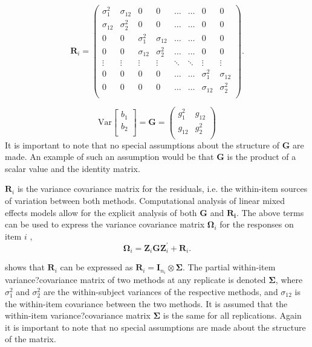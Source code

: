 \documentclass[12pt, a4paper]{report}
\theoremstyle{plain}
\theoremstyle{definition}
\theoremstyle{remark}
\begin{document}
\[ \boldsymbol{R}_i =\left(
\begin{array}{cccccccc}
\sigma^2_1  & \sigma_{12} & 0 & 0 & \ldots & \ldots & 0 & 0 \\
\sigma_{12} & \sigma^2_2  & 0 & 0  & \ldots & \ldots & 0 & 0\\

0 & 0 &\sigma^2_1  & \sigma_{12} & \ldots & \ldots& 0 &  0 \\
0 & 0 &\sigma_{12} & \sigma^2_2  & \ldots & \ldots & 0 & 0 \\
\vdots & \vdots &\vdots & \vdots & \ddots & \ddots& \vdots & \vdots \\

0 & 0 &0 & 0 & \ldots & \ldots&\sigma^2_1  & \sigma_{12} \\
0 & 0 &0 & 0 & \ldots & \ldots &\sigma_{12} & \sigma^2_2 \\
\end{array}
\right). \]

\[ \mbox{Var}  \left[
\begin{array}{c}
b_1   \\
b_2  \\
\end{array}
\right] =  \boldsymbol{G} =\left(
\begin{array}{cc}
g^2_1  & g_{12} \\
g_{12} & g^2_2 \\
\end{array}
\right) \]
It is important to note that no special assumptions about the structure of $\boldsymbol{G}$ are made. An example of such an assumption would be that $\boldsymbol{G}$ is the product of a scalar value and the identity matrix.

$\boldsymbol{R}_{i}$ is the variance covariance matrix for the residuals, i.e. the within-item sources of variation between both methods. Computational analysis of linear mixed effects models allow for the explicit analysis of both $\boldsymbol{G}$ and $\boldsymbol{R_i}$.
The above terms can be used to express the  variance covariance matrix $\boldsymbol{\Omega}_i$ for the responses on item $i$ ,
\[
\boldsymbol{\Omega}_i = \boldsymbol{Z}_i \boldsymbol{G} \boldsymbol{Z}_i^{\prime} + \boldsymbol{R}_i.
\]

\citet{hamlett} shows that $\boldsymbol{R}_{i}$  can be expressed as $\boldsymbol{R}_{i} = \boldsymbol{I}_{n_{i}} \otimes \boldsymbol{\Sigma}$. The partial within-item variance?covariance matrix of two methods at any replicate is denoted $\boldsymbol{\Sigma}$, where $\sigma^2_{1}$ and $\sigma^2_{2}$ are the within-subject variances of the respective methods, and $\sigma_{12}$ is the within-item covariance between the two methods. It is assumed that the within-item variance?covariance matrix $\boldsymbol{\Sigma}$ is the same for all replications. Again it is important to note that no special assumptions are made about the structure of the matrix.
\end{document}
